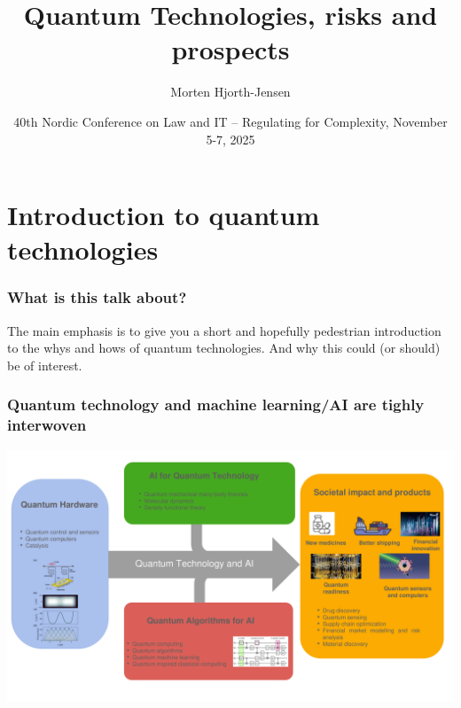 \documentclass{beamer}
\begin{document}
\title[Quantum Computing and ML]{\textbf{Quantum Technologies, risks and prospects}}
\author{Morten Hjorth-Jensen}
\date{40th Nordic Conference on Law and IT – Regulating for Complexity, November 5-7, 2025}





\begin{frame}
\titlepage
\end{frame}

\section{Introduction to quantum technologies}
\begin{frame}
\frametitle{What is this talk about?}

\begin{block}{}
The main emphasis is to give you a short and hopefully pedestrian introduction to the whys and hows of quantum technologies.
And why this could (or should) be of interest. 
\end{block}

\end{frame}

\begin{frame}
\frametitle{Quantum technology and machine learning/AI are tighly interwoven }


\centerline{\includegraphics[width=1.05\linewidth]{figures/figureintro.pdf}}

\end{frame}
\end{document}
